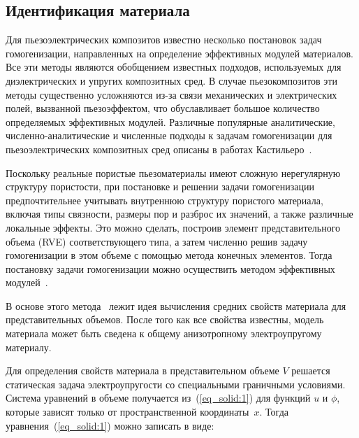 \subsection{Идентификация материала}

Для пьезоэлектрических композитов известно несколько постановок задач гомогенизации, направленных на определение эффективных модулей материалов. Все эти методы являются обобщением известных подходов, используемых для диэлектрических и упругих композитных сред. В случае пьезокомпозитов эти методы существенно усложняются из-за связи механических и электрических полей, вызванной пьезоэффектом, что обуславливает большое количество определяемых эффективных модулей. Различные популярные аналитические, численно-аналитические и численные подходы к задачам гомогенизации для пьезоэлектрических композитных сред описаны в работах Кастильеро~\cite{Castillero2001, Castillero1997}.

Поскольку реальные пористые пьезоматериалы имеют сложную нерегулярную структуру пористости, при постановке и решении задачи гомогенизации предпочтительнее учитывать внутреннюю структуру пористого материала, включая типы связности, размеры пор и разброс их значений, а также различные локальные эффекты. Это можно сделать, построив элемент представительного  объема (RVE) соответствующего типа, а затем численно решив задачу гомогенизации в этом объеме с помощью метода конечных элементов. Тогда постановку задачи гомогенизации можно осуществить методом эффективных модулей~\cite{Gerasimenko2019, Kurbatova2017}.

В основе этого метода~\cite{Do2023} лежит идея вычисления средних свойств материала для представительных объемов. После того как все свойства известны, модель материала может быть сведена к общему анизотропному электроупругому материалу.


Для определения свойств материала в представительном объеме $V$ решается статическая задача электроупругости со специальными граничными условиями.
Система уравнений в объеме получается из~(\ref{eq_solid:1}) для функций $u$ и $\phi$, которые зависят только от пространственной координаты~$x$. Тогда уравнения~(\ref{eq_solid:1}) можно записать в виде:

